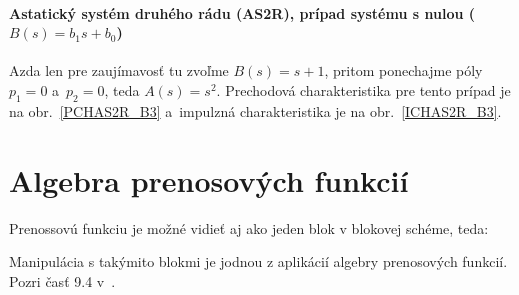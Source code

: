 \documentclass[a4paper, 10pt, ]{article}
\begin{document}
\paragraph{Astatický systém druhého rádu (AS2R), prípad systému s nulou ($B(s) = b_1 s + b_0$)}

Azda len pre zaujímavosť tu zvoľme $B(s) =  s + 1$, pritom ponechajme póly $p_1 = 0$ a~$p_2 = 0$, teda $A(s) = s^2$.  Prechodová charakteristika pre tento prípad je na obr.~\ref{PCHAS2R_B3} a~impulzná charakteristika je na obr.~\ref{ICHAS2R_B3}.

\begin{center}


	\label{PCHAS2R_B3}

\end{center}

\begin{center}


	\label{ICHAS2R_B3}

\end{center}













\section{Algebra prenosových funkcií}

Prenossovú funkciu je možné vidieť aj ako jeden blok v blokovej schéme, teda:


\begin{center}

    \makebox[\textwidth][c]{%
    
    }

	\label{TFalgebra_lenG}

\end{center}

Manipulácia s takýmito blokmi je jodnou z aplikácií algebry prenosových funkcií. Pozri časť 9.4 v~\cite{AsM08se}.
\end{document}
